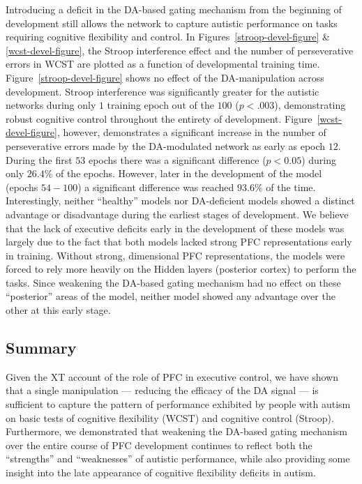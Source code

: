 Introducing a deficit in the DA-based gating mechanism from the
beginning of development still allows the network to capture autistic
performance on tasks requiring cognitive flexibility and control.  In
Figures~\ref{stroop-devel-figure} \& \ref{wcst-devel-figure}, the
Stroop interference effect and the number of perseverative errors in
WCST are plotted as a function of developmental training time.
Figure~\ref{stroop-devel-figure} shows no effect of the
DA-manipulation across development.  Stroop interference was
significantly greater for the autistic networks during only $1$ training epoch
out of the $100$ ($p<.003$), demonstrating robust cognitive control
throughout the entirety of development.
Figure~\ref{wcst-devel-figure}, however, demonstrates a significant
increase in the number of perseverative errors made by the
DA-modulated network as early as epoch $12$.  During the first $53$
epochs there was a significant difference ($p < 0.05$) during only
$26.4\%$ of the epochs.  However, later in the development of the
model (epochs $54-100$) a significant difference was reached $93.6\%$
of the time.  Interestingly, neither ``healthy'' models nor
DA-deficient models showed a distinct advantage or disadvantage during
the earliest stages of development.  We believe that the lack of
executive deficits early in the development of these models was
largely due to the fact that both models lacked strong PFC
representations early in training.  Without strong, dimensional PFC
representations, the models were forced to rely more heavily on the
Hidden layers (posterior cortex) to perform the tasks.  Since
weakening the DA-based gating mechanism had no effect on these
``posterior'' areas of the model, neither model showed any advantage
over the other at this early stage.

\subsection{Summary}

Given the XT account of the role of PFC in executive control, we have shown that a single manipulation --- reducing the efficacy of the DA signal --- is sufficient to capture the pattern of performance exhibited by people with autism on basic tests of cognitive flexibility (WCST) and cognitive control (Stroop).  Furthermore, we demonstrated that weakening the DA-based gating mechanism over the entire course of PFC development continues to reflect both the ``strengths'' and ``weaknesses'' of autistic performance, while also providing some insight into the late appearance of cognitive flexibility deficits in autism.  

